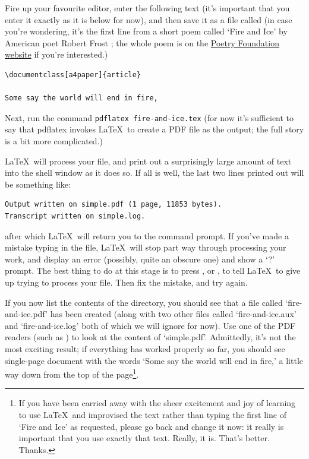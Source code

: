 \begin{refsection}
\label{sec:exercise-1}


Fire up your favourite editor, enter the following text (it's important that you enter it exactly as it is below for now), and then save it as a file called  (in case you're wondering, it's the first line from a short poem called `Fire and Ice' by American poet Robert Frost \citep{frost1923}; the whole poem is on the \href{http://www.poetryfoundation.org/poem/173527}{Poetry Foundation website} if you're interested.)

\begin{verbatim}
\documentclass[a4paper]{article}

Some say the world will end in fire,

\end{verbatim}
%
Next, run the command \texttt{pdflatex fire-and-ice.tex} (for now it's sufficient to say that pdflatex invokes \LaTeX\ to create a PDF file as the output; the full story is a bit more complicated.)

\LaTeX\ will process your file, and print out a surprisingly large amount of text into the shell window as it does so. If all is well, the last two lines printed out will be something like:

\begin{verbatim}
Output written on simple.pdf (1 page, 11853 bytes).
Transcript written on simple.log.
\end{verbatim}
%
after which \LaTeX\ will return you to the command prompt. If you've made a mistake typing in the file, \LaTeX\ will stop part way through processing your work, and display an error (possibly, quite an obscure one) and show a `?' prompt. The best thing to do at this stage is to press , or , to tell \LaTeX\ to give up trying to process your file. Then fix the mistake, and try again.  

If you now list the contents of the directory, you should see that a file called `fire-and-ice.pdf' has been created (along with two other files called `fire-and-ice.aux' and `fire-and-ice.log' both of which we will ignore for now). Use one of the PDF readers (such as ) to look at the content of `simple.pdf'.  Admittedly, it's not the most exciting result; if everything has worked properly so far, you should see single-page document with the words `Some say the world will end in fire,' a little way down from the top of the page\footnote{If you have been carried away with the sheer excitement and joy of learning to use \LaTeX\, and improvised the text rather than typing the first line of `Fire and Ice' as requested, please go back and change it now: it really is important that you use exactly that text. Really, it is. That's better. Thanks.}.


\end{refsection}
